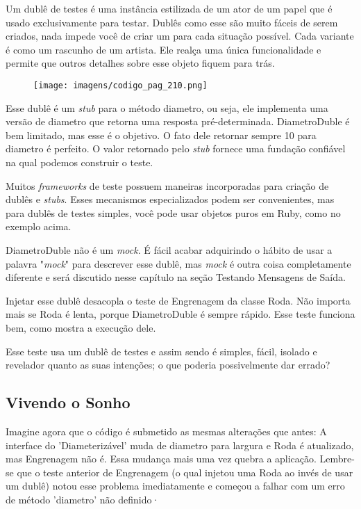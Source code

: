 Um dublê de testes é uma instância estilizada de um ator de um papel
que é usado exclusivamente para testar. Dublês como esse são muito fáceis de
serem criados, nada impede você de criar um para cada situação possível. Cada
variante é como um rascunho de um artista. Ele realça uma única funcionalidade
e permite que outros detalhes sobre esse objeto fiquem para trás.

\begin{figure}[!htbp]
  \center
  \texttt{[image: imagens/codigo\_pag\_210.png]}
  \label{img:codigo_pag_210}
\end{figure}

Esse dublê é um \textit{stub} para o método diametro, ou seja, ele implementa
uma versão de diametro que retorna uma resposta pré-determinada. DiametroDuble
é bem limitado, mas esse é o objetivo. O fato dele retornar sempre 10 para
diametro é perfeito. O valor retornado pelo \textit{stub} fornece uma fundação
confiável na qual podemos construir o teste.

Muitos \textit{frameworks} de teste possuem maneiras incorporadas para criação
de dublês e \textit{stubs}. Esses mecanismos especializados podem ser
convenientes, mas para dublês de testes simples, você pode usar objetos puros
em Ruby, como no exemplo acima.

DiametroDuble não é um \textit{mock}. É fácil acabar adquirindo o hábito de usar
a palavra "\textit{mock}" para descrever esse dublê, mas \textit{mock} é outra
coisa completamente diferente e será discutido nesse capítulo na seção
Testando Mensagens de Saída.

Injetar esse dublê desacopla o teste de Engrenagem da classe Roda. Não importa
mais se Roda é lenta, porque DiametroDuble é sempre rápido. Esse teste
funciona bem, como mostra a execução dele.

Esse teste usa um dublê de testes e assim sendo é simples, fácil, isolado e
revelador quanto as suas intenções; o que poderia possivelmente dar errado?

\subsection{Vivendo o Sonho}

Imagine agora que o código é submetido as mesmas alterações que antes:
A interface do 'Diameterizável' muda de diametro para largura e Roda é
atualizado, mas Engrenagem não é. Essa mudança mais uma vez quebra a aplicação.
Lembre-se que o teste anterior de Engrenagem (o qual injetou uma Roda ao invés
de usar um dublê) notou esse problema imediatamente e começou a falhar com um
erro de método 'diametro' não definido·

